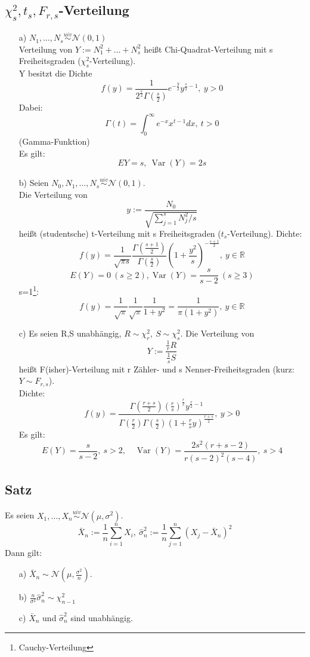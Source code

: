 \documentclass[a4paper,11pt,twoside,titlepage]{article}
\newcommand{\R}{{\mathbb R}}
\newcommand{\N}{{\mathbb N}}
\newcommand\NN{ \mathcal{N} } %
\newcommand{\uiv}{\ensuremath{\stackrel{uiv}{\sim}}}
\DeclareMathOperator{\var}{Var}
\begin{document}
\subsection{$\chi_s^2,t_s,F_{r,s}$-Verteilung}
\begin{itemize}
\item[a) ]$N_1,\ldots,N_s\uiv\NN(0,1)$\\
Verteilung von $Y:=N_1^2+\ldots+N_s^2$ heißt Chi-Quadrat-Verteilung mit s Freiheitsgraden ($\chi_s^2$-Verteilung).\\
Y besitzt die Dichte 
\[f(y)=\frac{1}{2^{\frac s2}\Gamma(\frac s2)}e^{-\frac y2}y^{\frac s2-1},\ y>0\]
Dabei:
\[\Gamma(t)=\int_0^\infty e^{-x} x^{t-1}dx,\ t>0\]
(Gamma-Funktion)\newline
[$\Gamma(x+1)=x\Gamma(x)\ (x>0)$, $\Gamma(n+1)=n!\ (n\in\N)$, $\Gamma(\frac12)=\sqrt \pi$]\\
Es gilt:
\[EY=s,\ \var(Y)=2s\]
\item[b) ]Seien $N_0,N_1,\ldots,N_s\uiv \NN(0,1)$.\\
Die  Verteilung von 
$$y:=\frac{N_0}{\sqrt{\sum_{j=1}^s N_j^2/s}}$$
heißt (studentsche) t-Verteilung mit s Freiheitsgraden ($t_s$-Verteilung). Dichte:
$$f(y)=\frac{1}{\sqrt{\pi s}}\frac{\Gamma(\frac{s+1}{2})}{\Gamma(\frac{s}{2})}(1+\frac{y^2}{s})^{-\frac{s+1}{2}},\ y\in\R$$
$$E(Y)=0\ (s\geq 2), \var(Y)=\frac{s}{s-2}\ (s\geq3)$$
s=1\footnote{Cauchy-Verteilung}: $$f(y)=\frac{1}{\sqrt\pi}\frac{1}{\sqrt\pi}\frac{1}{1+y^2}=\frac{1}{\pi(1+y^2)},\ y\in\R$$
\item[c) ]Es seien R,S unabhängig, $R\sim\chi^2_r,\ S\sim\chi^2_s$. Die Verteilung von 
$$Y:=\frac{\frac1r R}{\frac1s S}$$
heißt F(isher)-Verteilung mit r Zähler- und s Nenner-Freiheitsgraden (kurz: $Y\sim F_{r,s}$).\\
Dichte: $$ f(y)=\frac{\Gamma(\frac{r+s}{2})(\frac rs)^{\frac r2} y^{\frac r2 -1}}{\Gamma(\frac r2)\Gamma(\frac s2)(1+\frac rs y)^{\frac{r+s}{2}}},\ y>0$$
Es gilt: 
$$E(Y)= \frac{s}{s-2},\ s>2,\quad\var(Y)=\frac{2s^2(r+s-2)}{r(s-2)^2(s-4)},\ s>4$$
\end{itemize}

\subsection{Satz}
Es seien $X_1,\ldots,X_n\uiv\NN(\mu,\sigma^2)$.
$$\bar{X}_n:=\frac 1n\sum_{i=1}^nX_i,\ \hat\sigma_n^2:= \frac 1n \sum_{j=1}^n(X_j-\bar{X}_n)^2$$
Dann gilt: 
\begin{itemize}
\item[a) ]$\bar{X}_n \sim\NN(\mu,\frac{\sigma^2}{n})$.
\item[b) ]$\frac{n}{\sigma^2}\hat\sigma^2_n\sim\chi_{n-1}^2$
\item[c) ]$\bar{X}_n$ und $\hat\sigma_n^2$ sind unabhängig.
\end{itemize}
\end{document}

